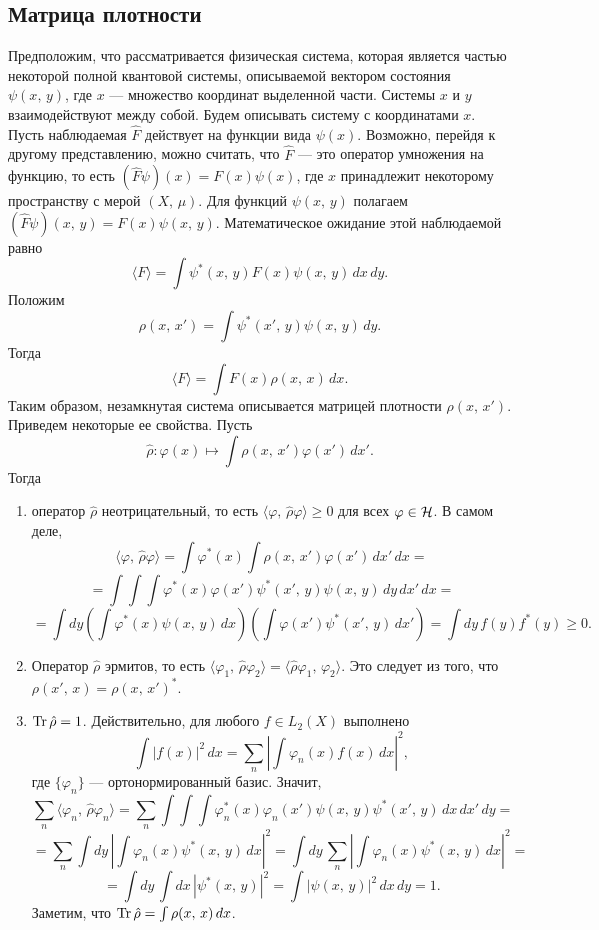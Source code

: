 \documentclass[a4paper
]{article}
\begin{document}
\subsection{Матрица плотности}
Предположим, что рассматривается физическая система, которая является частью
некоторой полной квантовой системы, описываемой вектором состояния
$\psi(x, \, y)$, где $x$ --- множество координат выделенной части.
Системы $x$ и $y$ взаимодействуют между собой. Будем описывать
систему с координатами $x$. Пусть наблюдаемая $\hat F$ действует на
функции вида $\psi(x)$. Возможно, перейдя к другому представлению, можно
считать, что $\hat F$ --- это оператор умножения на функцию, то есть
$(\hat F\psi)(x)=F(x)\psi(x)$, где $x$ принадлежит некоторому пространству
с мерой $(X, \, \mu)$. Для функций $\psi(x, \, y)$ полагаем $(\hat F\psi)
(x, \, y)=F(x)\psi(x, \, y)$. Математическое ожидание этой наблюдаемой
равно $$\langle F\rangle =\int \psi^*(x, \, y)F(x)\psi(x, \, y)\, dx\,
dy.$$ Положим $$\rho(x, \, x')=\int \psi^*(x', \, y)\psi(x, \, y)\, dy.$$
Тогда $$\langle F\rangle=\int F(x)\rho(x, \, x)\, dx.$$
Таким образом, незамкнутая система описывается матрицей плотности $\rho
(x, \, x')$. Приведем некоторые ее свойства. Пусть $$\hat \rho:\varphi(x)
\mapsto \int \rho(x, \, x')\varphi(x')\, dx'.$$ Тогда
\begin{enumerate}
\item оператор $\hat \rho$ неотрицательный, то есть $\langle \varphi, \,
\hat \rho \varphi\rangle\ge 0$ для всех $\varphi\in {\cal H}$. В самом деле,
$$\langle \varphi, \, \hat\rho \varphi\rangle=\int \varphi^*(x)\int \rho (x, \, x')
\varphi(x')\, dx'\, dx=$$$$=\int \int \int
\varphi^*(x)\varphi(x')\psi^*(x', \, y)\psi(x, \, y)\, dy\, dx'\,
dx=$$ $$=\int dy \left(\int \varphi^*(x) \psi(x, \, y)\,
dx\right)\left(\int \varphi(x')\psi^*(x', \, y)\, dx' \right)=\int
dy \, f(y)f^*(y)\ge 0.$$ \item Оператор $\hat\rho$ эрмитов, то
есть $\langle \varphi_1, \, \hat \rho \varphi_2\rangle=\langle
\hat \rho\varphi_1, \, \varphi_2\rangle$. Это следует из того, что
$\rho(x', \, x)=\rho(x, \, x')^*$. \item ${\rm Tr} \, \hat\rho=1$.
Действительно, для любого $f\in L_2(X)$ выполнено $$\int
|f(x)|^2\, dx=\sum \limits_n\left|\int \varphi_n(x)f(x)\,
dx\right|^2,$$ где $\{\varphi_n\}$ --- ортонормированный базис.
Значит,
$$\sum \limits _n \langle \varphi_n, \, \hat\rho\varphi_n\rangle=\sum \limits
_n \int \int \int \varphi_n^*(x)\varphi_n(x')\psi(x, \, y)\psi^*(x', \, y)
\, dx\, dx'\, dy=$$ $$=\sum \limits_n\int dy\, \left|\int \varphi_n(x)
\psi^*(x, \, y)\, dx\right|^2=\int dy\, \sum \limits_n \left|\int \varphi_n(x)
\psi^*(x, \, y)\, dx\right|^2=$$ $$=\int dy\, \int dx\, |\psi^*(x, \, y)|^2=
\int |\psi(x, \, y)|^2\, dx\, dy=1.$$ Заметим, что ${\rm Tr}\,
\hat \rho=\int \rho(x, \, x)\, dx$.
\end{enumerate}
\end{document}

